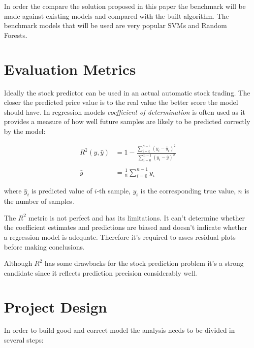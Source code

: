 In order the compare the solution proposed in this paper the benchmark will be made against existing models and compared with the built algorithm. The benchmark models that will be used are very popular SVMs and Random Forests.


\section*{Evaluation Metrics}

Ideally the stock predictor can be used in an actual automatic stock trading. The closer the predicted price value is to the real value the better score the model should have. In regression models \emph{coefficient of determination}  is often used as it provides a measure of how well future samples are likely to be predicted correctly by the model:

\begin{align*}
	R^2(y, \hat{y}) &= 1 - \frac{\sum_{i=0}^{n - 1} (y_i - \hat{y}_i)^2}{\sum_{i=0}^{n - 1} (y_i - \bar{y})^2} \\
	\\
	\bar{y} &=  \frac{1}{n} \sum_{i=0}^{n - 1} y_i
\end{align*}

\noindent
where \( \hat{y}_i \) is predicted value of \(i\)-th sample, \(y_i\) is the corresponding true value, \(n\) is the number of samples.

The \(R^2\) metric is not perfect and has its limitations. It can't determine whether the coefficient estimates and predictions are biased and doesn't indicate whether a regression model is adequate. Therefore it's required to asses residual plots before making conclusions.

Although \(R^2\) has some drawbacks for the stock prediction problem it's a strong candidate since it reflects prediction precision considerably well.

\section*{Project Design}

In order to build good and correct model the analysis needs to be divided in several steps:

